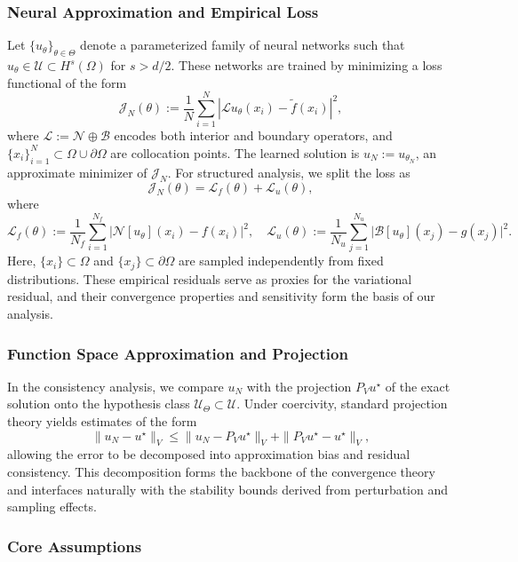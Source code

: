 \documentclass[11pt, a4paper]{article}
\begin{document}
\subsubsection{Neural Approximation and Empirical Loss}

Let $\{ u_\theta \}_{\theta \in \Theta}$ denote a parameterized family of neural networks such that $u_\theta \in \mathcal{U} \subset H^s(\Omega)$ for $s > d/2$. These networks are trained by minimizing a loss functional of the form
\[
\mathcal{J}_N(\theta) := \frac{1}{N} \sum_{i=1}^{N} \left| \mathcal{L} u_\theta(x_i) - \tilde{f}(x_i) \right|^2,
\]
where $\mathcal{L} := \mathcal{N} \oplus \mathcal{B}$ encodes both interior and boundary operators, and $\{x_i\}_{i=1}^N \subset \Omega \cup \partial \Omega$ are collocation points. The learned solution is $u_N := u_{\theta_N}$, an approximate minimizer of $\mathcal{J}_N$. For structured analysis, we split the loss as
\[
\mathcal{J}_N(\theta) = \mathcal{L}_f(\theta) + \mathcal{L}_u(\theta),
\]
where
\[
\mathcal{L}_f(\theta) := \frac{1}{N_f} \sum_{i=1}^{N_f} \big| \mathcal{N}[u_\theta](x_i) - f(x_i) \big|^2, \quad
\mathcal{L}_u(\theta) := \frac{1}{N_u} \sum_{j=1}^{N_u} \big| \mathcal{B}[u_\theta](x_j) - g(x_j) \big|^2.
\]Here, $\{x_i\} \subset \Omega$ and $\{x_j\} \subset \partial \Omega$ are sampled independently from fixed distributions. These empirical residuals serve as proxies for the variational residual, and their convergence properties and sensitivity form the basis of our analysis.

\subsubsection{Function Space Approximation and Projection}

In the consistency analysis, we compare $u_N$ with the projection $P_V u^\star$ of the exact solution onto the hypothesis class $\mathcal{U}_\Theta \subset \mathcal{U}$. Under coercivity, standard projection theory yields estimates of the form
\[
\| u_N - u^\star \|_V \leq \| u_N - P_V u^\star \|_V + \| P_V u^\star - u^\star \|_V,
\]allowing the error to be decomposed into approximation bias and residual consistency. This decomposition forms the backbone of the convergence theory and interfaces naturally \cite{quarteroni2008} with the stability bounds derived from perturbation and sampling effects.

\subsubsection{Core Assumptions}
\end{document}
